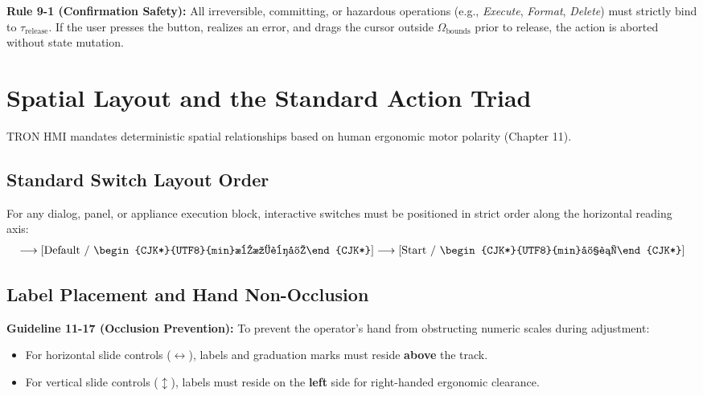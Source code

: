 \documentclass[10pt,journal,compsoc,twocolumn]{article}
\newcommand{\ja}[1]{\begin{CJK*}{UTF8}{min}#1\end{CJK*}}
\begin{document}
\textbf{Rule 9-1 (Confirmation Safety):} All irreversible, committing, or hazardous operations (e.g., \emph{Execute}, \emph{Format}, \emph{Delete}) must strictly bind to $\tau_{\text{release}}$. If the user presses the button, realizes an error, and drags the cursor outside $\Omega_{\text{bounds}}$ prior to release, the action is aborted without state mutation.

\section{Spatial Layout and the Standard Action Triad}
\label{sec:layout}

TRON HMI mandates deterministic spatial relationships based on human ergonomic motor polarity (Chapter 11).

\subsection{Standard Switch Layout Order}
For any dialog, panel, or appliance execution block, interactive switches must be positioned in strict order along the horizontal reading axis:
\begin{equation}
[\text{Cancel / \ja{取り消し}}] \longrightarrow [\text{Default / \ja{標準設定}}] \longrightarrow [\text{Start / \ja{実行}}]
\end{equation}

\subsection{Label Placement and Hand Non-Occlusion}
\textbf{Guideline 11-17 (Occlusion Prevention):} To prevent the operator's hand from obstructing numeric scales during adjustment:
\begin{itemize}[leftmargin=*]
    \item For horizontal slide controls ($\leftrightarrow$), labels and graduation marks must reside \textbf{above} the track.
    \item For vertical slide controls ($\updownarrow$), labels must reside on the \textbf{left} side for right-handed ergonomic clearance.
\end{itemize}
\end{document}
